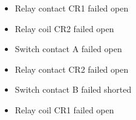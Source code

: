 \begin{itemize}
\item{} Relay contact CR1 failed open
\vskip 5pt 
\item{} Relay coil CR2 failed open
\vskip 5pt 
\item{} Switch contact A failed open
\vskip 5pt 
\item{} Relay contact CR2 failed open
\vskip 5pt 
\item{} Switch contact B failed shorted
\vskip 5pt 
\item{} Relay coil CR1 failed open
\end{itemize}





